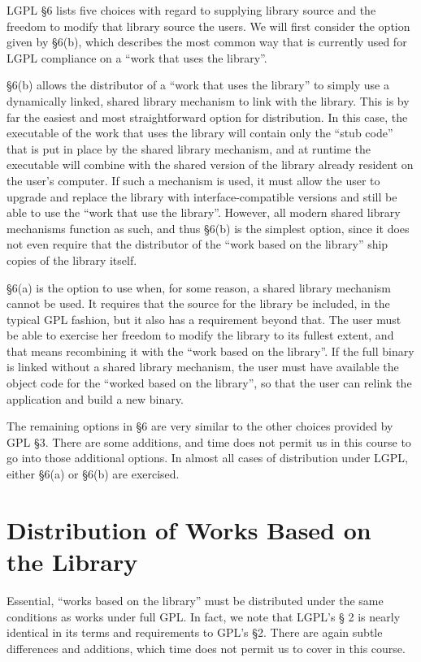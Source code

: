 \documentclass[12pt]{report}
\begin{document}
LGPL \S 6 lists five choices with regard to supplying library source and
the freedom to modify that library source the users.  We will first
consider the option given by \S 6(b), which describes the most common way
that is currently used for LGPL compliance on a ``work that uses the
library''.

\S 6(b) allows the distributor of a ``work that uses the library'' to
simply use a dynamically linked, shared library mechanism to link with the
library.  This is by far the easiest and most straightforward option for
distribution.  In this case, the executable of the work that uses the
library will contain only the ``stub code'' that is put in place by the
shared library mechanism, and at runtime the executable will combine with
the shared version of the library already resident on the user's computer.
If such a mechanism is used, it must allow the user to upgrade and
replace the library with interface-compatible versions and still be able
to use the ``work that use the library''.  However, all modern shared
library mechanisms function as such, and thus \S 6(b) is the simplest
option, since it does not even require that the distributor of the ``work
based on the library'' ship copies of the library itself.

\S 6(a) is the option to use when, for some reason, a shared library
mechanism cannot be used.  It requires that the source for the library be
included, in the typical GPL fashion, but it also has a requirement beyond
that.  The user must be able to exercise her freedom to modify the library
to its fullest extent, and that means recombining it with the ``work based
on the library''.  If the full binary is linked without a shared library
mechanism, the user must have available the object code for the ``worked
based on the library'', so that the user can relink the application and
build a new binary.

The remaining options in \S 6 are very similar to the other choices
provided by GPL \S 3.  There are some additions, and time does not permit
us in this course to go into those additional options.  In almost all
cases of distribution under LGPL, either \S 6(a) or \S 6(b) are exercised.

\section{Distribution of Works Based on the Library}

Essential, ``works based on the library'' must be distributed under the
same conditions as works under full GPL\@.  In fact, we note that LGPL's \S
2 is nearly identical in its terms and requirements to GPL's \S 2.  There
are again subtle differences and additions, which time does not permit us
to cover in this course.
\end{document}
